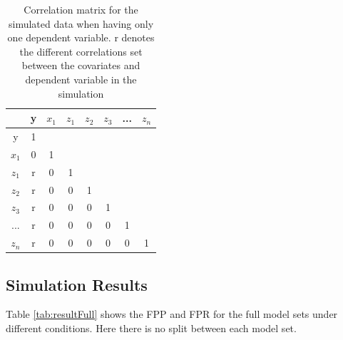 \begin{table}[H]
\centering
\caption*{Correlation matrix for the simulated data when having only one dependent variable. r denotes the different correlations set between the covariates and dependent variable in the simulation}
\label{correlation}
\begin{tabular}{c|ccccccc} 
\toprule
 & y & $x_1$ & $z_1$ & $z_2$ & $z_3$ & ... & $z_n$ \\ 
 \midrule
y & 1 &  &  &  &  &  &  \\ 
$x_1$ & 0 & 1 &  &  &  &  &  \\ 
$z_1$ & r & 0 & 1 &  &  &  &  \\  
$z_2$ & r & 0 & 0 & 1 &  &  &  \\  
$z_3$ & r & 0 & 0 & 0 & 1 &  &  \\  
... & r & 0 & 0 & 0 & 0 & 1 &  \\ 
$z_n$ & r & 0 & 0 & 0 & 0 & 0 & 1 \\ 
\bottomrule
\end{tabular}
\end{table}

\subsection{Simulation Results}
Table \ref{tab:resultFull} shows the FPP and FPR for the full model sets under different conditions. Here there is no split between each model set.






